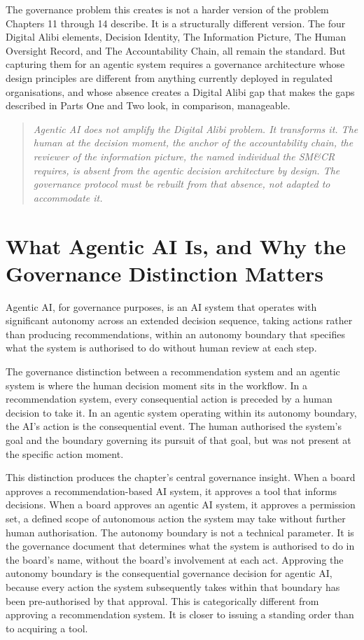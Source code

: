 The governance problem this creates is not a harder version of the problem Chapters 11 through 14 describe. It is a structurally different version. The four Digital Alibi elements, Decision Identity, The Information Picture, The Human Oversight Record, and The Accountability Chain, all remain the standard. But capturing them for an agentic system requires a governance architecture whose design principles are different from anything currently deployed in regulated organisations, and whose absence creates a Digital Alibi gap that makes the gaps described in Parts One and Two look, in comparison, manageable.

\begin{quote}
\emph{Agentic AI does not amplify the Digital Alibi problem. It transforms it. The human at the decision moment, the anchor of the accountability chain, the reviewer of the information picture, the named individual the SM\&CR requires, is absent from the agentic decision architecture by design. The governance protocol must be rebuilt from that absence, not adapted to accommodate it.}
\end{quote}

\scenebreak

\section{What Agentic AI Is, and Why the Governance Distinction Matters}

Agentic AI, for governance purposes, is an AI system that operates with significant autonomy across an extended decision sequence, taking actions rather than producing recommendations, within an autonomy boundary that specifies what the system is authorised to do without human review at each step.

The governance distinction between a recommendation system and an agentic system is where the human decision moment sits in the workflow. In a recommendation system, every consequential action is preceded by a human decision to take it. In an agentic system operating within its autonomy boundary, the AI's action is the consequential event. The human authorised the system's goal and the boundary governing its pursuit of that goal, but was not present at the specific action moment.

This distinction produces the chapter's central governance insight. When a board approves a recommendation-based AI system, it approves a tool that informs decisions. When a board approves an agentic AI system, it approves a permission set, a defined scope of autonomous action the system may take without further human authorisation. The autonomy boundary is not a technical parameter. It is the governance document that determines what the system is authorised to do in the board's name, without the board's involvement at each act. Approving the autonomy boundary is the consequential governance decision for agentic AI, because every action the system subsequently takes within that boundary has been pre-authorised by that approval. This is categorically different from approving a recommendation system. It is closer to issuing a standing order than to acquiring a tool.

